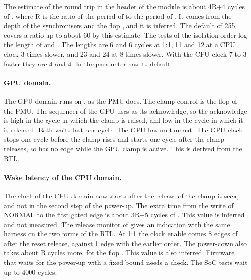 The estimate of the round trip in the header of the module is about 4R+4 cycles of , where R is the ratio of the period of  to the period of . It comes from the depth of the synchronisers and the flop , and it is inferred. The default of 255 covers a ratio up to about 60 by this estimate. The tests of the isolation order log the length of  and . The lengths are 6 and 6 cycles at 1:1, 11 and 12 at a CPU clock 3 times slower, and 23 and 24 at 8 times slower. With the CPU clock 7 to 3 faster they are 4 and 4. In  the parameter has its default.

\paragraph{GPU domain.} The GPU domain runs on , as the PMU does. The clamp control is the flop  of the PMU. The sequencer of the GPU uses  as its acknowledge, so the acknowledge is high in the cycle in which the clamp is raised, and low in the cycle in which it is released. Both waits last one cycle. The GPU has no timeout. The GPU clock stops one cycle before the clamp rises and starts one cycle after the clamp releases, so  has no edge while the GPU clamp is active. This is derived from the RTL.

\paragraph{Wake latency of the CPU domain.} The clock of the CPU domain now starts after the release of the clamp is seen, and not in the second step of the power-up. The extra time from the write of NORMAL to the first gated edge is about 3R+5 cycles of . This value is inferred and not measured. The release monitor of  gives an indication with the same harness on the two forms of the RTL. At 1:1 the clock enable comes 8 edges of  after the reset release, against 1 edge with the earlier order. The power-down also takes about R cycles more, for the flop . This value is also inferred. Firmware that waits for the power-up with a fixed bound needs a check. The SoC tests wait up to 4000 cycles.

